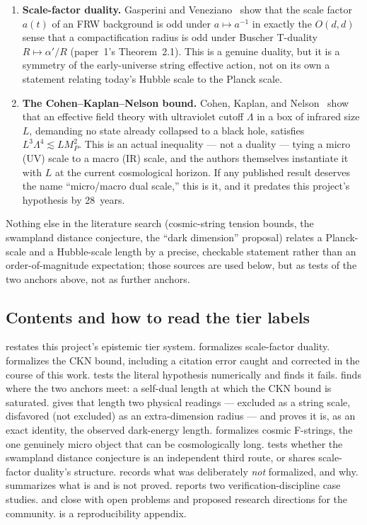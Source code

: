 \documentclass[11pt,a4paper]{article}
\theoremstyle{remark}
\begin{document}
\begin{enumerate}
\item \textbf{Scale-factor duality.} Gasperini and Veneziano~\cite{GasperiniVeneziano1993} show
that the scale factor $a(t)$ of an FRW background is odd under $a\mapsto a^{-1}$ in exactly the
$O(d,d)$ sense that a compactification radius is odd under Buscher T-duality $R\mapsto\alpha'/R$
(paper~1's Theorem~2.1). This is a genuine duality, but it is a symmetry of the early-universe
string effective action, not on its own a statement relating today's Hubble scale to the Planck
scale.
\item \textbf{The Cohen--Kaplan--Nelson bound.} Cohen, Kaplan, and Nelson~\cite{CKN1999} show that
an effective field theory with ultraviolet cutoff $\Lambda$ in a box of infrared size $L$, demanding
no state already collapsed to a black hole, satisfies $L^3\Lambda^4\lesssim LM_P^2$. This is an
actual inequality --- not a duality --- tying a micro (UV) scale to a macro (IR) scale, and the
authors themselves instantiate it with $L$ at the current cosmological horizon. If any published
result deserves the name ``micro/macro dual scale,'' this is it, and it predates this project's
hypothesis by 28~years.
\end{enumerate}
Nothing else in the literature search (cosmic-string tension bounds, the swampland distance
conjecture, the ``dark dimension'' proposal) relates a Planck-scale and a Hubble-scale length by a
precise, checkable statement rather than an order-of-magnitude expectation; those sources are used
below, but as tests of the two anchors above, not as further anchors.

\subsection{Contents and how to read the tier labels}
 restates this project's epistemic tier system.  formalizes
scale-factor duality.  formalizes the CKN bound, including a citation error caught
and corrected in the course of this work.  tests the literal hypothesis
numerically and finds it fails.  finds where the two anchors meet: a self-dual
length at which the CKN bound is saturated.  gives that length two physical
readings --- excluded as a string scale, disfavored (not excluded) as an extra-dimension radius ---
and  proves it is, as an exact identity, the observed dark-energy length.
 formalizes cosmic F-strings, the one genuinely micro object that can be
cosmologically long.  tests whether the swampland distance conjecture is an
independent third route, or shares scale-factor duality's structure.  records
what was deliberately \emph{not} formalized, and why.  summarizes what is and is
not proved.  reports two verification-discipline case studies. 
and  close with open problems and proposed research directions for the
community.  is a reproducibility appendix.
\end{document}
